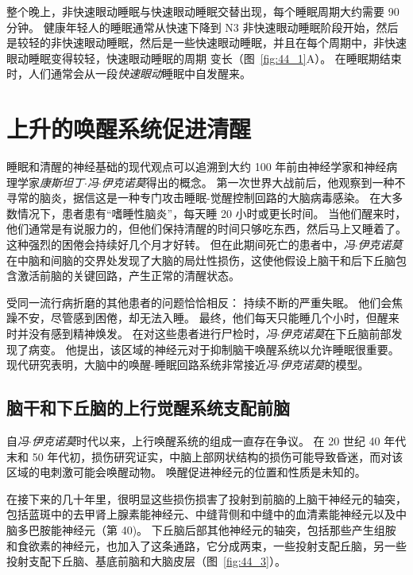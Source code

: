 整个晚上，非快速眼动睡眠与快速眼动睡眠交替出现，每个睡眠周期大约需要 90 分钟。
健康年轻人的睡眠通常从快速下降到 N3 非快速眼动睡眠阶段开始，然后是较轻的非快速眼动睡眠，然后是一些快速眼动睡眠，并且在每个周期中，非快速眼动睡眠变得较轻，快速眼动睡眠的周期 变长（图~\ref{fig:44_1}A）。
在睡眠期结束时，人们通常会从一段\textit{快速眼动}睡眠中自发醒来。



\section{上升的唤醒系统促进清醒}

睡眠和清醒的神经基础的现代观点可以追溯到大约 100 年前由神经学家和神经病理学家\textit{康斯坦丁$\cdot$冯$\cdot$伊克诺莫}得出的概念。
第一次世界大战前后，他观察到一种不寻常的脑炎，据信这是一种专门攻击睡眠-觉醒控制回路的大脑病毒感染。
在大多数情况下，患者患有“嗜睡性脑炎”，每天睡 20 小时或更长时间。
当他们醒来时，他们通常是有说服力的，但他们保持清醒的时间只够吃东西，然后马上又睡着了。
这种强烈的困倦会持续好几个月才好转。
但在此期间死亡的患者中，\textit{冯$\cdot$伊克诺莫}在中脑和间脑的交界处发现了大脑的局灶性损伤，这使他假设上脑干和后下丘脑包含激活前脑的关键回路，产生正常的清醒状态。


受同一流行病折磨的其他患者的问题恰恰相反：
持续不断的严重失眠。
他们会焦躁不安，尽管感到困倦，却无法入睡。
最终，他们每天只能睡几个小时，但醒来时并没有感到精神焕发。
在对这些患者进行尸检时，\textit{冯$\cdot$伊克诺莫}在下丘脑前部发现了病变。
他提出，该区域的神经元对于抑制脑干唤醒系统以允许睡眠很重要。
现代研究表明，大脑中的唤醒-睡眠回路系统非常接近\textit{冯$\cdot$伊克诺莫}的模型。



\subsection{脑干和下丘脑的上行觉醒系统支配前脑}

自\textit{冯$\cdot$伊克诺莫}时代以来，上行唤醒系统的组成一直存在争议。
在 20 世纪 40 年代末和 50 年代初，损伤研究证实，中脑上部网状结构的损伤可能导致昏迷，而对该区域的电刺激可能会唤醒动物。
唤醒促进神经元的位置和性质是未知的。


在接下来的几十年里，很明显这些损伤损害了投射到前脑的上脑干神经元的轴突，包括蓝斑中的去甲肾上腺素能神经元、中缝背侧和中缝中的血清素能神经元以及中脑多巴胺能神经元（第 40)。
下丘脑后部其他神经元的轴突，包括那些产生组胺和食欲素的神经元，也加入了这条通路，它分成两束，一些投射支配丘脑，另一些投射支配下丘脑、基底前脑和大脑皮层（图~\ref{fig:44_3}）。


